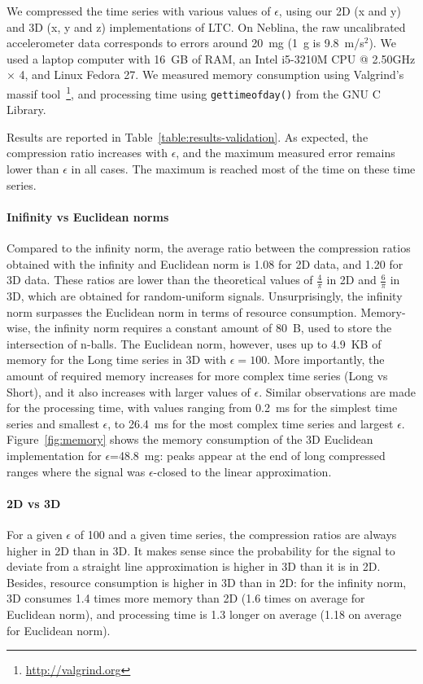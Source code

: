 \documentclass[10pt, conference, compsocconf]{IEEEtran}
\begin{document}
We compressed the time series with various values of $\epsilon$, using 
our 2D (x and y) and 3D (x, y and z) implementations of LTC. On 
Neblina, the raw uncalibrated accelerometer data corresponds to errors 
around 20~mg (1~g is 9.8~m/s$^2$). We used a 
laptop computer with 16~GB of RAM, an Intel i5-3210M CPU @ 2.50GHz 
× 4, and Linux Fedora 27. We measured memory consumption using 
Valgrind's massif 
tool~\cite{nethercote2006building}\footnote{\url{http://valgrind.org}}, 
and processing time using \texttt{gettimeofday()} from the GNU C 
Library. 

Results are reported in Table~\ref{table:results-validation}. 
As expected, the compression ratio increases with $\epsilon$, and the 
maximum measured error remains lower than $\epsilon$ in all cases. The 
maximum is reached most of the time on these time series.

\paragraph{Inifinity vs Euclidean norms}
Compared to the infinity norm, the average ratio between the compression ratios obtained
with the infinity and Euclidean norm is 1.08 for 2D data, and 1.20 
for 3D data. These ratios are lower than the theoretical values of 
$\frac{4}{\pi}$ in 2D and $\frac{6}{\pi}$ in 3D, which are obtained for 
random-uniform signals. Unsurprisingly, the infinity norm surpasses the 
Euclidean norm in terms of resource consumption. Memory-wise, the 
infinity norm requires a constant amount of 80~B, used to store the 
intersection of n-balls. The Euclidean norm, however, uses up to 4.9~KB of memory 
for the Long time series in 3D with $\epsilon=100$. More importantly, 
the amount of required memory increases for more complex time series 
(Long vs Short), and it also increases with larger 
values of $\epsilon$. Similar observations are made for the processing 
time, with values ranging from 0.2~ms for the simplest time series and 
smallest $\epsilon$, to 26.4~ms for the most complex time series and 
largest $\epsilon$. Figure~\ref{fig:memory} shows the memory consumption 
of the 3D Euclidean implementation for $\epsilon$=48.8~mg: peaks appear
at the end of long compressed ranges where the signal was $\epsilon$-closed
to the linear approximation.

\paragraph{2D vs 3D}
For a given $\epsilon$ of 100 and a given time series, the compression 
ratios are always higher in 2D than in 3D. It makes sense since the 
probability for the signal to deviate from a straight line 
approximation is higher in 3D than it is in 2D. Besides, resource 
consumption is higher in 3D than in 2D: for the infinity norm, 3D 
consumes 1.4 times more memory than 2D (1.6 times on average for 
Euclidean norm), and processing time is 1.3 longer on average (1.18 on 
average for Euclidean norm).
\end{document}
